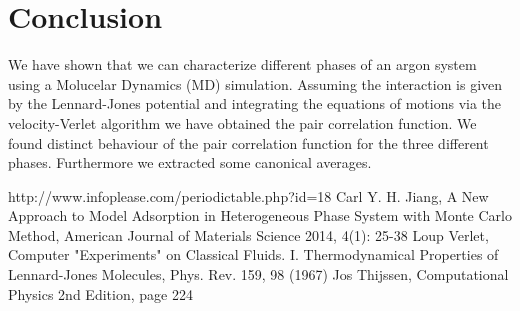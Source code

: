 \documentclass[11pt]{article}
\begin{document}
\section{Conclusion}
We have shown that we can characterize different phases of an argon system using a Molucelar Dynamics (MD) simulation. Assuming the interaction is given by the Lennard-Jones potential and integrating the equations of motions via the velocity-Verlet algorithm we have obtained the pair correlation function. We found distinct behaviour of the pair correlation function for the three different phases. Furthermore we extracted some canonical averages.


\begin{thebibliography}{x}
http://www.infoplease.com/periodictable.php?id=18
Carl Y. H. Jiang, A New Approach to Model Adsorption in Heterogeneous
Phase System with Monte Carlo Method, American Journal of Materials Science 2014, 4(1): 25-38
Loup Verlet, Computer "Experiments" on Classical Fluids. I. Thermodynamical Properties of Lennard-Jones Molecules, Phys. Rev. 159, 98 (1967)
Jos Thijssen, Computational Physics 2nd Edition, page 224
\end{thebibliography}
\end{document}
